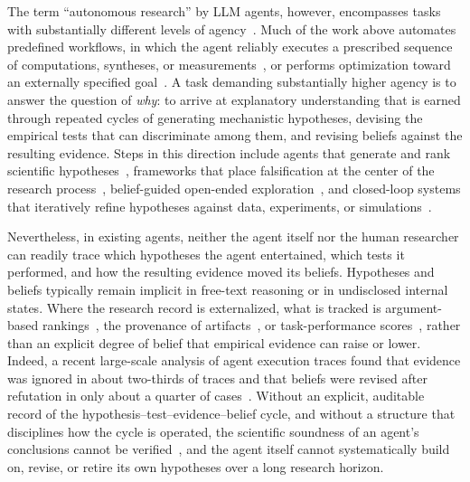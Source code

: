The term ``autonomous research'' by LLM agents, however, encompasses
tasks with substantially different levels of
agency~\cite{RiosGarcia2026AIScientists}.
Much of the work above automates predefined workflows, in which the agent
reliably executes a prescribed sequence of computations, syntheses, or
measurements~\cite{Bran2024ChemCrow,Boiko2023Coscientist,Darvish2025ORGANA,Deng2026AtomisticSkills},
or performs optimization toward an externally specified
goal~\cite{YanguasGil2026ALDOptimization,Fei2026AgenticLLM}.
A task demanding substantially higher agency is to answer the question of
\emph{why}: to arrive at explanatory understanding that is earned through
repeated cycles of generating mechanistic hypotheses, devising the
empirical tests that can discriminate among them, and revising beliefs
against the resulting evidence.
Steps in this direction include agents that generate and rank scientific
hypotheses~\cite{Ghafarollahi2025SciAgents,Yang2024MOOSE,Yang2025MOOSEChem,Yang2025MOOSEChem2,Ke2025BioDisco,Gottweis2026CoScientist},
frameworks that place falsification at the center of the research
process~\cite{Liu2024AIGS,Huang2025POPPER}, belief-guided open-ended
exploration~\cite{Agarwal2025AutoDiscovery}, and closed-loop systems that
iteratively refine hypotheses against data, experiments, or
simulations~\cite{Mitchener2025Kosmos,Ghareeb2025Robin,Wang2026ScienceClaw,Jin2026Arbor,Wiemann2026DiscoverPhysics}.

Nevertheless, in existing agents, neither the agent itself nor the
human researcher can readily trace which hypotheses the agent
entertained, which tests it performed, and how the resulting evidence
moved its beliefs.
Hypotheses and beliefs typically remain implicit in free-text
reasoning or in undisclosed internal states.
Where the research record is externalized, what is tracked is
argument-based rankings~\cite{Gottweis2026CoScientist}, the provenance
of artifacts~\cite{Wang2026ScienceClaw}, or task-performance
scores~\cite{Jin2026Arbor}, rather than an explicit degree of belief
that empirical evidence can raise or lower.
Indeed, a recent large-scale analysis of agent execution traces found that
evidence was ignored in about two-thirds of traces and that beliefs were
revised after refutation in only about a quarter of
cases~\cite{RiosGarcia2026AIScientists}.
Without an explicit, auditable record of the
hypothesis--test--evidence--belief cycle, and without a structure that
disciplines how the cycle is operated, the scientific soundness of an
agent's conclusions cannot be
verified~\cite{Wang2026WorkflowClosure,Bisht2026AgenticNotBuilt}, and
the agent itself cannot systematically build on, revise, or retire its
own hypotheses over a long research horizon.

